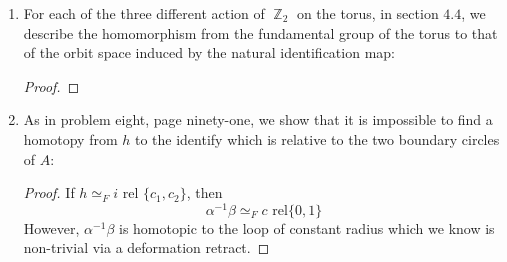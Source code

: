 \documentclass{book}
\DeclareMathOperator*{\Z}{\mathbb{Z}}
\begin{document}
\begin{enumerate}[(1)]
\begin{itemize}
            \item $f(e^{i \theta}) = 
                \begin{cases} 
                    e^{i \theta } & \theta \in [0, \pi] \\
                    e^{i(2\pi - \theta)} & \theta \in [\pi, 2\pi]
                \end{cases}$: 
                \begin{proof} Note, $f(1) = 1$. $f_*$ means that any loop part on the upper half of $S^1$ is identified to the lower part of $S^1$. Thus, it returns the straight line for each loop on $S^1$. 
                \end{proof}
        \end{itemize}

    \item For each of the three different action of $\Z_2$ on the torus, in section $4.4$, we describe the homomorphism from the fundamental group of the torus to that of the orbit space induced by the natural identification map: 
        \begin{proof}
        \end{proof}

    \item As in problem eight, page ninety-one, we show that it is impossible to find a homotopy from $h$ to the identify which is relative to the two boundary circles of $A$: 
        \begin{proof} If $h \simeq_F i$ rel $\{c_1, c_2\}$, then 
            \[\alpha^{-1} \beta \simeq_F c \text{ rel} \{0,1\}\]
            However, $\alpha^{-1} \beta$ is homotopic to the loop of constant radius which we know is non-trivial via a deformation retract. 
        \end{proof}

\end{enumerate}
\end{document}
